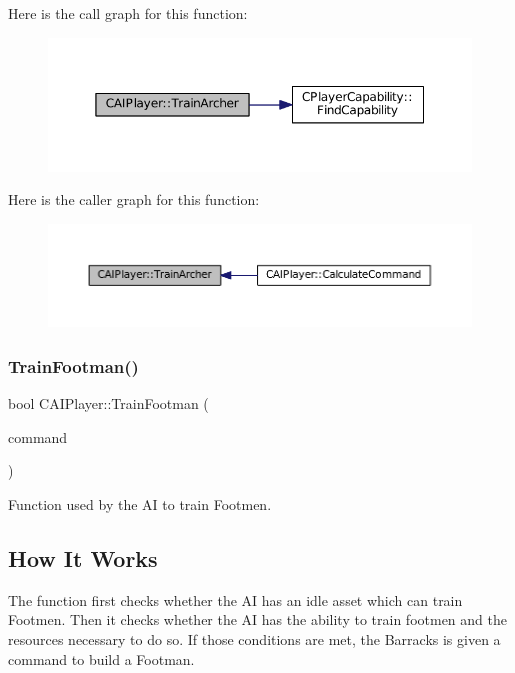 Here is the call graph for this function\+:\nopagebreak
\begin{figure}[H]
\begin{center}
\leavevmode
\includegraphics[width=350pt]{classCAIPlayer_af2edf1e3c54d6af693f768f86d484fd6_cgraph}
\end{center}
\end{figure}
Here is the caller graph for this function\+:\nopagebreak
\begin{figure}[H]
\begin{center}
\leavevmode
\includegraphics[width=350pt]{classCAIPlayer_af2edf1e3c54d6af693f768f86d484fd6_icgraph}
\end{center}
\end{figure}
\hypertarget{classCAIPlayer_aa3f9c1d0d449a45a24e065d2086527b0}{}\label{classCAIPlayer_aa3f9c1d0d449a45a24e065d2086527b0} 
\subsubsection{\texorpdfstring{Train\+Footman()}{TrainFootman()}}
{\footnotesize\ttfamily bool C\+A\+I\+Player\+::\+Train\+Footman (\begin{DoxyParamCaption}\item[{\hyperlink{structSPlayerCommandRequest}{S\+Player\+Command\+Request} \&}]{command }\end{DoxyParamCaption})\hspace{0.3cm}{\ttfamily [protected]}}



Function used by the AI to train Footmen. 

\hypertarget{classCAIPlayer_tfhow_sec}{}\subsection{How It Works}\label{classCAIPlayer_tfhow_sec}
The function first checks whether the AI has an idle asset which can train Footmen. Then it checks whether the AI has the ability to train footmen and the resources necessary to do so. If those conditions are met, the Barracks is given a command to build a Footman. 

